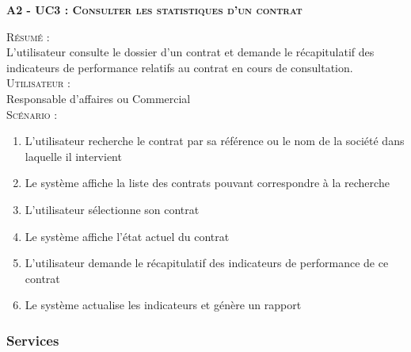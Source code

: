 \noindent\textsc{\bf{A2 - UC3 :} Consulter les statistiques d’un contrat}
\begin{shaded}
\noindent\textsc{Résumé :}\\

L’utilisateur consulte le dossier d’un contrat et demande le récapitulatif des indicateurs de performance relatifs au contrat en cours de consultation. \\

\noindent\textsc{Utilisateur :}\\

Responsable d’affaires ou Commercial \\

\noindent\textsc{Scénario :} \\
\begin{enumerate}
    \item L’utilisateur recherche le contrat par sa référence ou le nom de la société dans laquelle il intervient
    \item Le système affiche la liste des contrats pouvant correspondre à la recherche
    \item L’utilisateur sélectionne son contrat
    \item Le système affiche l’état actuel du contrat
    \item L’utilisateur demande le récapitulatif des indicateurs de performance de ce contrat
    \item Le système actualise les indicateurs et génère un rapport
\end{enumerate}
\end{shaded}

\subsubsection{Services}

